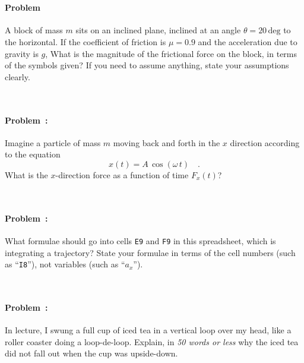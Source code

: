 \documentclass[12pt]{article}
\renewcommand{\deg}{\mathrm{deg}}
\newcommand{\cell}[1]{\texttt{{#1}}}
\newcounter{problem}
\begin{document}
~ \vfill ~

\paragraph{Problem~\theproblem}%
A block of mass $m$ sits on an inclined plane, inclined at an angle
$\theta = 20\,\deg$ to the horizontal.  If the coefficient of friction
is $\mu = 0.9$ and the acceleration due to gravity is $g$, What is the
magnitude of the frictional force on the block, in terms of the
symbols given?  If you need to assume anything, state your assumptions
clearly.

~ \vfill ~

\clearpage

\paragraph{Problem~\theproblem:}%
Imagine a particle of mass $m$ moving back and forth in the $x$
direction according to the equation
\begin{equation}
x(t)= A\,\cos\left(\omega\,t\right) \quad .
\end{equation}
What is the $x$-direction force as a function of time $F_x(t)$?

~ \vfill ~

\paragraph{Problem~\theproblem:}%
What formulae should go into cells \cell{E9} and \cell{F9} in this
spreadsheet, which is integrating a trajectory?  State your formulae
in terms of the cell numbers (such as ``\cell{I8}''), not variables
(such as ``$a_x$''). \\

~ \vfill ~

\clearpage

\paragraph{Problem~\theproblem:}%
In lecture, I swung a full cup of iced tea in a vertical loop over my
head, like a roller coaster doing a loop-de-loop.  Explain, in
\emph{50 words or less} why the iced tea did not fall out when the cup
was upside-down.

~ \vfill ~
\end{document}
